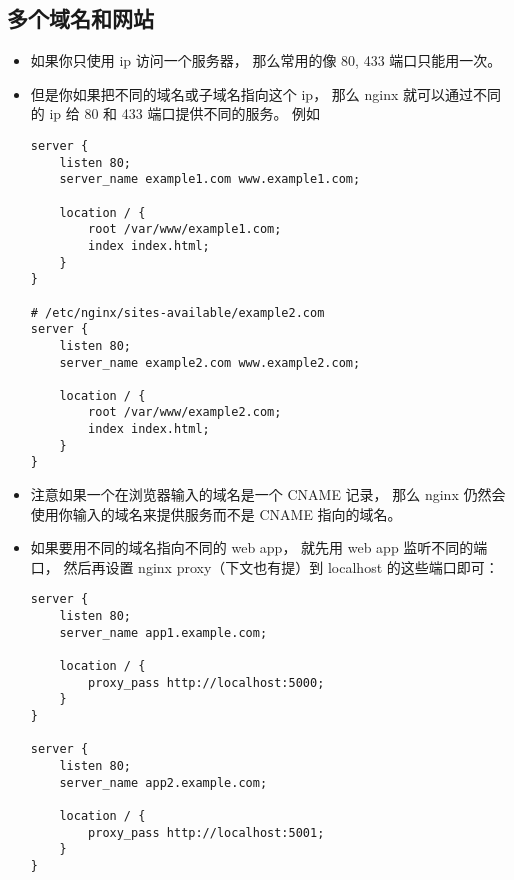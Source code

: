 \subsection{多个域名和网站}
\begin{itemize}
\item 如果你只使用 ip 访问一个服务器， 那么常用的像 80, 433 端口只能用一次。
\item 但是你如果把不同的域名或子域名指向这个 ip， 那么 nginx 就可以通过不同的 ip 给 80 和 433 端口提供不同的服务。 例如
\begin{lstlisting}[language=none]
server {
    listen 80;
    server_name example1.com www.example1.com;

    location / {
        root /var/www/example1.com;
        index index.html;
    }
}

# /etc/nginx/sites-available/example2.com
server {
    listen 80;
    server_name example2.com www.example2.com;

    location / {
        root /var/www/example2.com;
        index index.html;
    }
}
\end{lstlisting}
\item 注意如果一个在浏览器输入的域名是一个 CNAME 记录， 那么 nginx 仍然会使用你输入的域名来提供服务而不是 CNAME 指向的域名。
\item 如果要用不同的域名指向不同的 web app， 就先用 web app 监听不同的端口， 然后再设置 nginx proxy（下文也有提）到 localhost 的这些端口即可：
\begin{lstlisting}[language=none]
server {
    listen 80;
    server_name app1.example.com;

    location / {
        proxy_pass http://localhost:5000;
    }
}

server {
    listen 80;
    server_name app2.example.com;

    location / {
        proxy_pass http://localhost:5001;
    }
}
\end{lstlisting}
\end{itemize}

